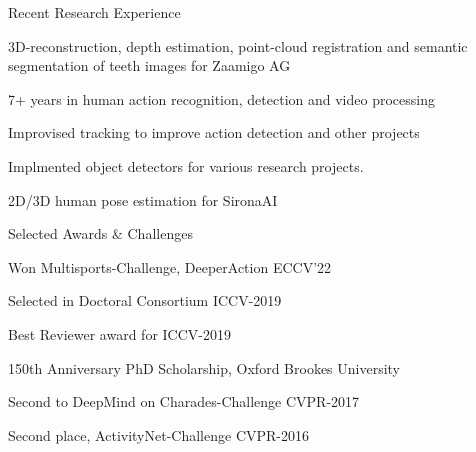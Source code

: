 \documentclass{resume} %
\begin{document}
\begin{paracol}{2}
\begin{rSection}{Recent Research Experience}{} 
  \begin{sSubsection}{3D-reconstruction, depth estimation, point-cloud registration and semantic segmentation of teeth images for Zaamigo AG}\end{sSubsection}
  \begin{sSubsection}{7+ years in human action recognition, detection and  video processing}\end{sSubsection}
  \begin{sSubsection}{Improvised tracking to improve action detection and other projects}\end{sSubsection}
  \begin{sSubsection}{Implmented object detectors for various research projects.}\end{sSubsection}
  \begin{sSubsection}{2D/3D human pose estimation for SironaAI}\end{sSubsection}

\end{rSection}

\switchcolumn
\begin{rSection}{Selected Awards \& Challenges}{}
\begin{sSubsection}{Won Multisports-Challenge, DeeperAction ECCV'22}\end{sSubsection} %
\begin{sSubsection}{Selected in Doctoral Consortium ICCV-2019}\end{sSubsection}  %
\begin{sSubsection}{Best Reviewer award for ICCV-2019}\end{sSubsection} %
\begin{sSubsection}{150th Anniversary PhD Scholarship, Oxford Brookes University}\end{sSubsection} %
\begin{sSubsection}{Second to DeepMind on Charades-Challenge CVPR-2017}\end{sSubsection} %
\begin{sSubsection}{Second place, ActivityNet-Challenge CVPR-2016}\end{sSubsection} %
\end{rSection}


\end{paracol}
\end{document}
